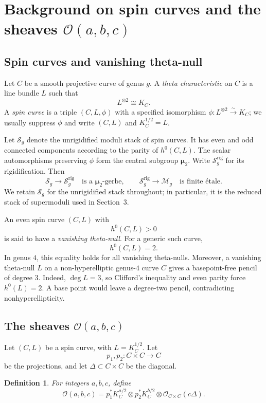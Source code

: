 \documentclass[11pt]{article}
\newtheorem{definition}[theorem]{Definition}
\newcommand{\OO}{\mathcal O}
\newcommand{\MM}{\mathcal M}
\newcommand{\SSS}{\mathcal S}
\begin{document}
\section{Background on spin curves and the sheaves
\texorpdfstring{$\OO(a,b,c)$}{O(a,b,c)}}

\subsection{Spin curves and vanishing theta-null}

Let $C$ be a smooth projective curve of genus $g$. A \emph{theta characteristic} on $C$ is a line bundle $L$ such that
\[
L^{\otimes 2}\cong K_C.
\]
A \emph{spin curve} is a triple $(C,L,\phi)$ with a specified
isomorphism $\phi:L^{\otimes2}\xrightarrow{\sim}K_C$; we usually suppress
$\phi$ and write $(C,L)$ and $K_C^{1/2}=L$.

Let $\SSS_g$ denote the unrigidified moduli stack of spin curves.
It has even and odd connected components according to the parity of
$h^0(C,L)$. The scalar automorphisms preserving $\phi$ form the central
subgroup $\boldsymbol\mu_2$. Write $\SSS_g^{\mathrm{rig}}$ for its
rigidification. Then
\[
\SSS_g\longrightarrow\SSS_g^{\mathrm{rig}}
\quad\text{is a }\boldsymbol\mu_2\text{-gerbe},\qquad
\SSS_g^{\mathrm{rig}}\longrightarrow\MM_g
\quad\text{is finite \'etale}.
\]
We retain $\SSS_g$ for the unrigidified stack throughout; in particular,
it is the reduced stack of supermoduli used in Section~3.



An even spin curve $(C,L)$ with
\[
h^0(C,L)>0
\]
is said to have a \emph{vanishing theta-null}. For a generic such curve,
\[
h^0(C,L)=2.
\]
In genus $4$, this equality holds for all vanishing theta-nulls.
{Moreover, a vanishing theta-null $L$ on a non-hyperelliptic
genus-$4$ curve $C$ gives a basepoint-free pencil of degree $3$.}
{Indeed, $\deg L=3$, so Clifford's inequality and even parity force
$h^0(L)=2$. A base point would leave a degree-two pencil, contradicting
nonhyperellipticity.}

\subsection{The sheaves \texorpdfstring{$\OO(a,b,c)$}{O(a,b,c)}}

Let $(C,L)$ be a spin curve, with $L=K_C^{1/2}$. Let
\[
p_1,p_2:C\times C\to C
\]
be the projections, and let $\Delta\subset C\times C$ be the diagonal.

\begin{definition}
For integers $a,b,c$, define
\[
\OO(a,b,c)
=
p_1^*K_C^{a/2}\otimes p_2^*K_C^{b/2}\otimes \OO_{C\times C}(c\Delta).
\]
\end{definition}
\end{document}
